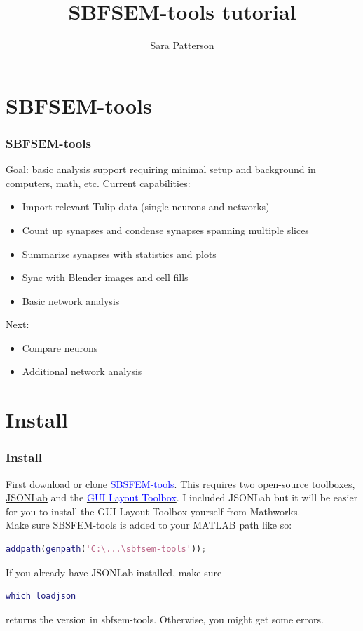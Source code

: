 \documentclass[11pt]{beamer}
\title{SBFSEM-tools tutorial}
\author{Sara Patterson}
\institute{University of Washington}
\begin{document}
	\maketitle
	\begin{frame}
		\tableofcontents
	\end{frame}
	\section{SBFSEM-tools}
\begin{frame}
	\frametitle{SBFSEM-tools}
	Goal: basic analysis support requiring minimal setup and background in computers, math, etc.
	\vskip10pt
	Current capabilities:
	\begin{itemize}
		\item Import relevant Tulip data (single neurons and networks)
		\item Count up synapses and condense synapses spanning multiple slices 
		\item Summarize synapses with statistics and plots
		\item Sync with Blender images and cell fills
		\item Basic network analysis
	\end{itemize}
	Next:\\
	\begin{itemize}
		\item Compare neurons
		\item Additional network analysis
	\end{itemize}
\end{frame}
\section{Install}
\begin{frame}[fragile]
	\frametitle{Install}
	First download or clone \href{www.github.com/sarastokes/sbfsem-tools}{\textcolor{blue}{SBSFEM-tools}}.
	This requires two open-source toolboxes, \href{https://www.mathworks.com/matlabcentral/fileexchange/33381-jsonlab--a-toolbox-to-encode-decode-json-files}{JSONLab} and the \href{https://www.mathworks.com/matlabcentral/fileexchange/47982-gui-layout-toolbox}{\textcolor{blue}{GUI Layout Toolbox}}. I included JSONLab but it will be easier for you to install the GUI Layout Toolbox yourself from Mathworks.\\
	Make sure SBSFEM-tools is added to your MATLAB path like so:
	\begin{lstlisting}[language=matlab]	
	addpath(genpath('C:\...\sbfsem-tools'));\end{lstlisting}
	If you already have JSONLab installed, make sure 
	\begin{lstlisting}[language=matlab] 
	which loadjson\end{lstlisting} 
	returns the version in sbfsem-tools. Otherwise, you might get some errors.
\end{frame}
\end{document}
